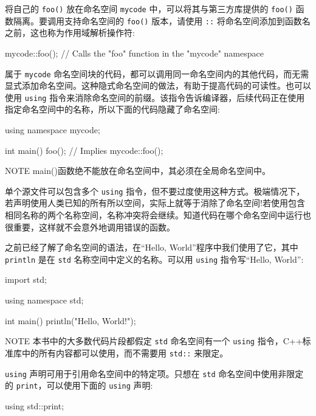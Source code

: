 将自己的 \verb|foo()| 放在命名空间 \verb|mycode| 中，可以将其与第三方库提供的 \verb|foo()| 函数隔离。要调用支持命名空间的 \verb|foo()| 版本，请使用 \verb|::| 将命名空间添加到函数名之前，这也称为作用域解析操作符:

\begin{cpp}
mycode::foo(); // Calls the "foo" function in the "mycode" namespace
\end{cpp}

属于 \verb|mycode| 命名空间块的代码，都可以调用同一命名空间内的其他代码，而无需显式添加命名空间。这种隐式命名空间的做法，有助于提高代码的可读性。也可以使用 \verb|using| 指令来消除命名空间的前缀。该指令告诉编译器，后续代码正在使用指定命名空间中的名称，所以下面的代码隐藏了命名空间:

\begin{cpp}
using namespace mycode;

int main()
{
    foo(); // Implies mycode::foo();
}
\end{cpp}

\begin{myNotic}{NOTE}
main()函数绝不能放在命名空间中，其必须在全局命名空间中。
\end{myNotic}

单个源文件可以包含多个 \verb|using| 指令，但不要过度使用这种方式。极端情况下，若声明使用人类已知的所有所以空间，实际上就等于消除了命名空间!若使用包含相同名称的两个名称空间，名称冲突将会继续。知道代码在哪个命名空间中运行也很重要，这样就不会意外地调用错误的函数。

之前已经了解了命名空间的语法，在“Hello, World”程序中我们使用了它，其中 \verb|println| 是在 \verb|std| 名称空间中定义的名称。可以用 \verb|using| 指令写“Hello, World”:

\begin{cpp}
import std;

using namespace std;

int main()
{
    println("Hello, World!");
}
\end{cpp}

\begin{myNotic}{NOTE}
本书中的大多数代码片段都假定 \verb|std| 命名空间有一个 \verb|using| 指令，C++标准库中的所有内容都可以使用，而不需要用 \verb|std::| 来限定。
\end{myNotic}

\verb|using| 声明可用于引用命名空间中的特定项。只想在 \verb|std| 命名空间中使用非限定的 \verb|print|，可以使用下面的 \verb|using| 声明:

\begin{cpp}
using std::print;
\end{cpp}

